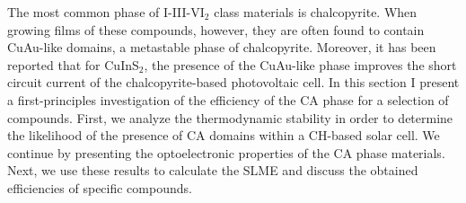 \begin{refsection}
The most common phase of I-III-VI$_2$ class materials is chalcopyrite. When growing films of these compounds, however, they are often found to contain CuAu-like domains, a metastable phase of chalcopyrite. Moreover, it has been reported that for CuInS$_2$, the presence of the CuAu-like phase improves the short circuit current of the chalcopyrite-based photovoltaic cell. In this section I present a first-principles investigation of the efficiency of the CA phase for a selection of compounds. First, we analyze the thermodynamic stability in order to determine the likelihood of the presence of CA domains within a CH-based solar cell. We continue by presenting the optoelectronic properties of the CA phase materials. Next, we use these results to calculate the SLME and discuss the obtained efficiencies of specific compounds. 




\end{refsection}
